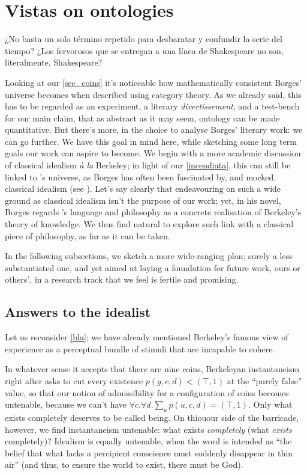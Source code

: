 \section{Vistas on ontologies}\label{vistas}
\epigraph{¿No basta un solo término repetido para desbaratar y confundir la serie del tiempo? ¿Los fervorosos que se entregan a una línea de Shakespeare no son, literalmente, Shakespeare?}{\cite{confutacion}}
Looking at our \autoref{sec_coins} it's noticeable how mathematically consistent Borges' universe becomes when described using category theory. As we already said, this has to be regarded as an experiment, a literary \emph{divertissement}, and a test-bench for our main claim, that as abstract as it may seem, ontology can be made quantitative. But there's more, in the choice to analyse Borges' literary work: we can go further. We have this goal in mind here, while sketching some long term goals our work can aspire to become. We begin with a more academic discussion of classical idealism \emph{à la} Berkeley; in light of our \autoref{incendiata}, this can still be linked to \tlon's universe, as Borges has often been fascinated by, and mocked, classical idealism (see \cite{confutacion}). Let's say clearly that endeavouring on such a wide ground as classical idealism isn't the purpose of our work; yet, in his novel, Borges regards \tlon's language and philosophy as a concrete realisation of Berkeley's theory of knowledge. We thus find natural to explore such link with a classical piece of philosophy, as far as it can be taken.

In the following subsections, we sketch a more wide-ranging plan; surely a less substantiated one, and yet aimed at laying a foundation for future work, ours or others', in a research track that we feel is fertile and promising.
\subsection{Answers to the idealist}\label{berkelei}
Let us reconsider \autoref{bla}; we have already mentioned Berkeley's famous view of experience as a perceptual bundle of stimuli that are incapable to cohere.

In whatever sense it accepts that there are nine coins, Berkeleyan instantaneism right after asks to cut every existence $p(g,c,d) < (\top,1)$ at the ``purely false'' value, so that our notion of admissibility for a configuration of coins becomes untenable, because we can't have $\forall c.\forall d.\sum_u p(u,c,d) = (\top,1)$. Only what exists completely deserves to be called being. On thiouour side of the barricade, however, we find instantaneism untenable: what exists \emph{completely} (what \emph{exists} completely)? Idealism is equally untenable, when the word is intended as ``the belief that what lacks a percipient conscience must suddenly disappear in thin air'' (and thus, to ensure the world to exist, there must be God).


